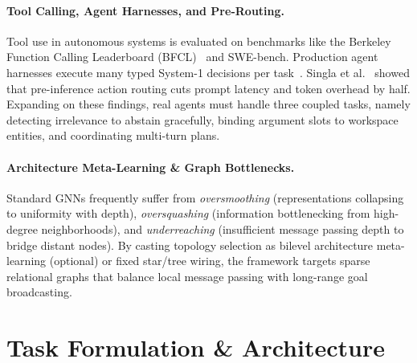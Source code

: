 \documentclass[10pt,twocolumn,letterpaper]{article}
\begin{document}
\paragraph{Tool Calling, Agent Harnesses, and Pre-Routing.}
Tool use in autonomous systems is evaluated on benchmarks like the Berkeley Function Calling Leaderboard (BFCL)~\cite{gorilla-bfcl} and SWE-bench. Production agent harnesses execute many typed System-1 decisions per task~\cite{li2026fastmodels}. Singla et al.~\cite{singla2026agentweave} showed that pre-inference action routing cuts prompt latency and token overhead by half. Expanding on these findings, real agents must handle three coupled tasks, namely detecting irrelevance to abstain gracefully, binding argument slots to workspace entities, and coordinating multi-turn plans.

\paragraph{Architecture Meta-Learning \& Graph Bottlenecks.}
Standard GNNs frequently suffer from \emph{oversmoothing} (representations collapsing to uniformity with depth), \emph{oversquashing} (information bottlenecking from high-degree neighborhoods), and \emph{underreaching} (insufficient message passing depth to bridge distant nodes). By casting topology selection as bilevel architecture meta-learning (optional) or fixed star/tree wiring, the framework targets sparse relational graphs that balance local message passing with long-range goal broadcasting.

\section{Task Formulation \& Architecture}
\end{document}
